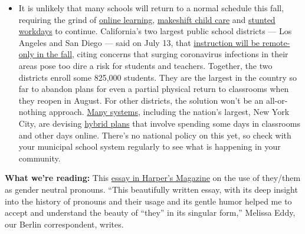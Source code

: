 \begin{itemize}
  \begin{itemize}
  \tightlist
  \item
    It is unlikely that many schools will return to a normal schedule
    this fall, requiring the grind of
    \href{https://www.nytimes3xbfgragh.onion/2020/06/05/us/coronavirus-education-lost-learning.html?action=click\&pgtype=Article\&state=default\&region=MAIN_CONTENT_3\&context=storylines_faq}{online
    learning},
    \href{https://www.nytimes3xbfgragh.onion/2020/05/29/us/coronavirus-child-care-centers.html?action=click\&pgtype=Article\&state=default\&region=MAIN_CONTENT_3\&context=storylines_faq}{makeshift
    child care} and
    \href{https://www.nytimes3xbfgragh.onion/2020/06/03/business/economy/coronavirus-working-women.html?action=click\&pgtype=Article\&state=default\&region=MAIN_CONTENT_3\&context=storylines_faq}{stunted
    workdays} to continue. California's two largest public school
    districts --- Los Angeles and San Diego --- said on July 13, that
    \href{https://www.nytimes3xbfgragh.onion/2020/07/13/us/lausd-san-diego-school-reopening.html?action=click\&pgtype=Article\&state=default\&region=MAIN_CONTENT_3\&context=storylines_faq}{instruction
    will be remote-only in the fall}, citing concerns that surging
    coronavirus infections in their areas pose too dire a risk for
    students and teachers. Together, the two districts enroll some
    825,000 students. They are the largest in the country so far to
    abandon plans for even a partial physical return to classrooms when
    they reopen in August. For other districts, the solution won't be an
    all-or-nothing approach.
    \href{https://bioethics.jhu.edu/research-and-outreach/projects/eschool-initiative/school-policy-tracker/}{Many
    systems}, including the nation's largest, New York City, are
    devising
    \href{https://www.nytimes3xbfgragh.onion/2020/06/26/us/coronavirus-schools-reopen-fall.html?action=click\&pgtype=Article\&state=default\&region=MAIN_CONTENT_3\&context=storylines_faq}{hybrid
    plans} that involve spending some days in classrooms and other days
    online. There's no national policy on this yet, so check with your
    municipal school system regularly to see what is happening in your
    community.
  \end{itemize}
\end{itemize}

\textbf{What we're reading:} This
\href{https://harpers.org/archive/2020/08/all-my-pronouns-the-singular-they/}{essay
in Harper's Magazine} on the use of they/them as gender neutral
pronouns. ``This beautifully written essay, with its deep insight into
the history of pronouns and their usage and its gentle humor helped me
to accept and understand the beauty of ``they'' in its singular form,''
Melissa Eddy, our Berlin correspondent, writes.

